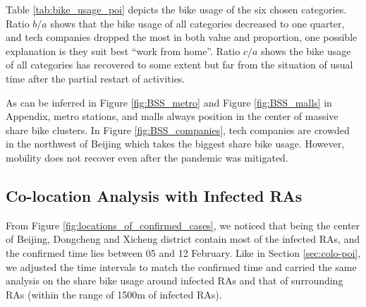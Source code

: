 \documentclass[ijgi,submit,moreauthors,pdftex]{Definitions/mdpi}
\begin{document}
Table \ref{tab:bike_usage_poi} depicts the bike usage of the six chosen categories.
Ratio $b/a$ shows that the bike usage of all categories decreased to one quarter, and tech companies dropped the most in both value and proportion, one possible explanation is they suit best ``work from home''. 
Ratio $c/a$ shows the bike usage of all categories has recovered to some extent but far from the situation of usual time after the partial restart of activities.

As can be inferred in Figure \ref{fig:BSS_metro} and Figure \ref{fig:BSS_malls} in Appendix, metro stations, and malls always position in the center of massive share bike clusters.
In Figure \ref{fig:BSS_companies}, tech companies are crowded in the northwest of Beijing which takes the biggest share bike usage.
However, mobility does not recover even after the pandemic was mitigated.

\subsection{Co-location Analysis with Infected RAs}

From Figure \ref{fig:locations_of_confirmed_cases}, we noticed that being the center of Beijing, Dongcheng and Xicheng district contain most of the infected RAs, and the confirmed time lies between 05 and 12 February.
Like in Section \ref{sec:colo-poi}, we adjusted the time intervals to match the confirmed time and carried the same analysis on the share bike usage around infected RAs and that of surrounding RAs (within the range of 1500m of infected RAs).
\end{document}
